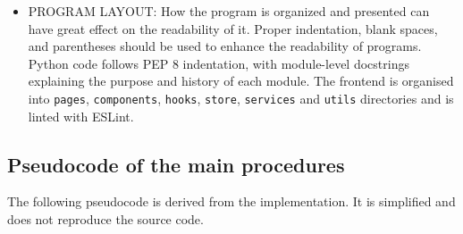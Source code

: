 \documentclass[12pt,a4paper]{report}
\begin{document}
\begin{itemize}
  \item   PROGRAM LAYOUT:
How the program is organized and presented can have great effect on the readability of it. Proper indentation, blank spaces, and parentheses should be used to enhance the readability of programs. Python code follows PEP 8 indentation, with module-level docstrings explaining the purpose and history of each module. The frontend is organised into \texttt{pages}, \texttt{components}, \texttt{hooks}, \texttt{store}, \texttt{services} and \texttt{utils} directories and is linted with ESLint.

\end{itemize}

\subsection{Pseudocode of the main procedures}
The following pseudocode is derived from the implementation. It is simplified and does not reproduce the source code.
\end{document}
